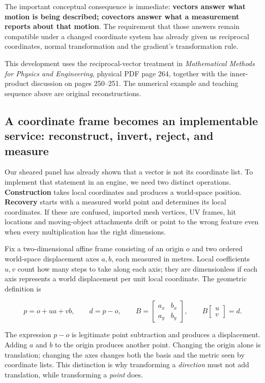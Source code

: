 The important conceptual consequence is immediate: \textbf{vectors answer what motion is being described; covectors answer what a measurement reports about that motion}. The requirement that those answers remain compatible under a changed coordinate system has already given us reciprocal coordinates, normal transformation and the gradient's transformation rule.

This development uses the reciprocal-vector treatment in \emph{Mathematical Methods for Physics and Engineering}, physical PDF page 264, together with the inner-product discussion on pages 250--251. The numerical example and teaching sequence above are original reconstructions.

\subsection{A coordinate frame becomes an implementable service: reconstruct, invert, reject, and measure}\label{01-foundations-i-ch017-a-coordinate-frame-becomes-an-implementable-service-reconstruct-invert-reject-and-measure}

Our sheared panel has already shown that a vector is not its coordinate list. To implement that statement in an engine, we need two distinct operations. \textbf{Construction} takes local coordinates and produces a world-space position. \textbf{Recovery} starts with a measured world point and determines its local coordinates. If these are confused, imported mesh vertices, UV frames, hit locations and moving-object attachments drift or point to the wrong feature even when every multiplication has the right dimensions.

Fix a two-dimensional affine frame consisting of an origin \(o\) and two ordered world-space displacement axes \(a,b\), each measured in metres. Local coefficients \(u,v\) count how many steps to take along each axis; they are dimensionless if each axis represents a world displacement per unit local coordinate. The geometric definition is

\[
p=o+ua+vb,\qquad d=p-o,\qquad
B=\begin{bmatrix}a_x&b_x\\a_y&b_y\end{bmatrix},\qquad
B\begin{bmatrix}u\\v\end{bmatrix}=d.
\]

The expression \(p-o\) is legitimate point subtraction and produces a displacement. Adding \(a\) and \(b\) to the origin produces another point. Changing the origin alone is translation; changing the axes changes both the basis and the metric seen by coordinate lists. This distinction is why transforming a \emph{direction} must not add translation, while transforming a \emph{point} does.

